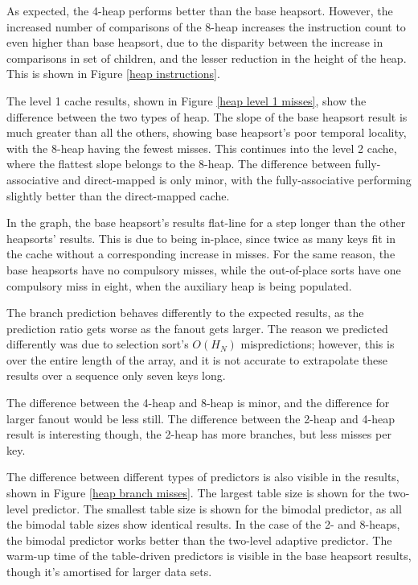 
As expected, the 4-heap performs better than the base heapsort. However, the
increased number of comparisons of the 8-heap increases the instruction count to
even higher than base heapsort, due to the disparity between the increase in
comparisons in set of children, and the lesser reduction in the height of the
heap. This is shown in Figure \ref{heap instructions}.

The level 1 cache results, shown in Figure \ref{heap level 1 misses}, show the
difference between the two types of heap. The slope of the base heapsort result
is much greater than all the others, showing base heapsort's poor temporal
locality, with the 8-heap having the fewest misses. This continues into the
level 2 cache, where the flattest slope belongs to the 8-heap. The difference
between fully-associative and direct-mapped is only minor, with the
fully-associative performing slightly better than the direct-mapped cache.

In the graph, the base heapsort's results flat-line for a step longer than the
other heapsorts' results. This is due to being in-place, since twice as many
keys fit in the cache without a corresponding increase in misses. For the same
reason, the base heapsorts have no compulsory misses, while the out-of-place
sorts have one compulsory miss in eight, when the auxiliary heap is being
populated.

The branch prediction behaves differently to the expected results, as the
prediction ratio gets worse as the fanout gets larger. The reason we predicted
differently was due to selection sort's $O(H_N)$ mispredictions; however, this
is over the entire length of the array, and it is not accurate to extrapolate
these results over a sequence only seven keys long.

The difference between the 4-heap and 8-heap is minor, and the difference for
larger fanout would be less still. The difference between the 2-heap and 4-heap
result is interesting though, the 2-heap has more branches, but less misses per
key.

The difference between different types of predictors is also visible in the
results, shown in Figure \ref{heap branch misses}. The largest table size is
shown for the two-level predictor. The smallest table size is shown for the
bimodal predictor, as all the bimodal table sizes show identical results.  In
the case of the 2- and 8-heaps, the bimodal predictor works better than the
two-level adaptive predictor. The warm-up time of the table-driven predictors is
visible in the base heapsort results, though it's amortised for larger data
sets.

